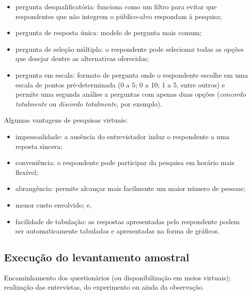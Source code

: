 \documentclass[
]{book}
\providecommand{\tightlist}{%
  \setlength{\itemsep}{0pt}\setlength{\parskip}{0pt}}
\begin{document}
\hfill\break

\begin{itemize}
\tightlist
\item
  pergunta desqualificatória: funciona como um filtro para evitar que respondentes que não integrem o público-alvo respondam à pesquisa;
\item
  pergunta de resposta única: modelo de pergunta mais comum;
\item
  pergunta de seleção múltipla: o respondente pode selecionar todas as opções que desejar dentre as alternativas oferecidas;
\item
  pergunta em escala: formato de pergunta onde o respondente escolhe em uma escala de pontos pré-determinada (0 a 5; 0 a 10; 1 a 5, entre outros) e permite uma segunda análise a perguntas com apenas duas opções (\emph{concordo totalmente} ou \emph{discordo totalmente}, por exemplo).
\end{itemize}

\hfill\break

Algumas vantagens de pesquisas virtuais:

\hfill\break

\begin{itemize}
\tightlist
\item
  impessoalidade: a ausência do entrevistador induz o respondente a uma reposta sincera;
\item
  conveniência: o respondente pode participar da pesquisa em horário mais flexível;
\item
  abrangência: permite alcançar mais facilmente um maior número de pessoas;
\item
  menor custo envolvido; e,
\item
  facilidade de tabulação: as respostas apresentadas pelo respondente podem ser automaticamente tabuladas e apresentadas na forma de gráficos.
\end{itemize}

\hfill\break

\hypertarget{execuuxe7uxe3o-do-levantamento-amostral}{%
\subsection{Execução do levantamento amostral}\label{execuuxe7uxe3o-do-levantamento-amostral}}

\hfill\break

Encaminhamento dos questionários (ou disponibilização em meios virtuais); realização das entrevistas, do experimento ou ainda da observação.
\end{document}
